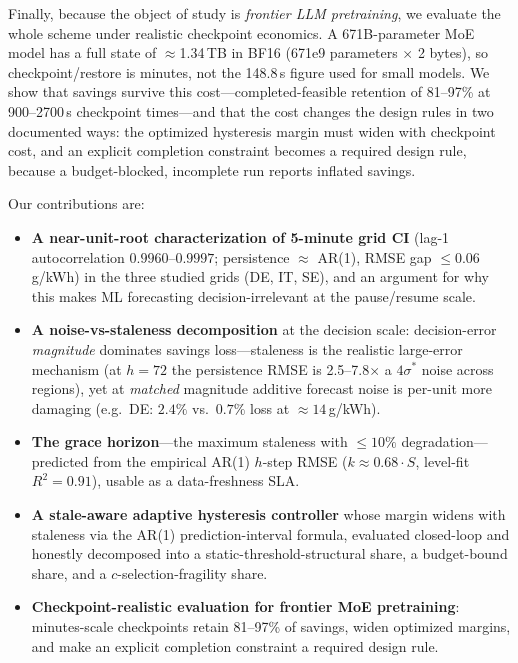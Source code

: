 \documentclass[sigconf,nonacm=false]{acmart}
\begin{document}
Finally, because the object of study is \emph{frontier LLM pretraining}, we
evaluate the whole scheme under realistic checkpoint economics. A 671B-parameter
MoE model has a full state of $\approx$1.34\,TB in BF16 (671e9 parameters
$\times$ 2 bytes), so checkpoint/restore is
minutes, not the 148.8\,s figure used for small models. We show that savings
survive this cost---completed-feasible retention of 81--97\% at 900--2700\,s
checkpoint times---and that the cost changes the design rules in two documented
ways: the optimized hysteresis margin must widen with checkpoint cost, and an
explicit completion constraint becomes a required design rule, because a
budget-blocked, incomplete run reports inflated savings.

Our contributions are:
\begin{itemize}
  \item \textbf{A near-unit-root characterization of 5-minute grid CI} (lag-1
        autocorrelation $0.9960$--$0.9997$; persistence $\approx$ AR(1), RMSE gap
        $\le 0.06$\,g/kWh) in the three studied grids (DE, IT, SE), and an argument
        for why this makes ML forecasting decision-irrelevant at the
        pause/resume scale.
  \item \textbf{A noise-vs-staleness decomposition} at the decision scale:
        decision-error \emph{magnitude} dominates savings loss---staleness is the
        realistic large-error mechanism (at $h{=}72$ the persistence RMSE is
        2.5--7.8$\times$ a $4\sigma^*$ noise across regions), yet at
        \emph{matched} magnitude additive forecast noise is per-unit more
        damaging (e.g.\ DE: $2.4\%$ vs.\ $0.7\%$ loss at $\approx14$\,g/kWh).
  \item \textbf{The grace horizon}---the maximum staleness with $\le 10\%$
        degradation---predicted from the empirical AR(1) $h$-step RMSE
        ($k\approx0.68\cdot S$, level-fit $R^2{=}0.91$), usable as a data-freshness SLA.
  \item \textbf{A stale-aware adaptive hysteresis controller} whose margin
        widens with staleness via the AR(1) prediction-interval formula,
        evaluated closed-loop and honestly decomposed into a
        static-threshold-structural share, a budget-bound share, and a
        $c$-selection-fragility share.
  \item \textbf{Checkpoint-realistic evaluation for frontier MoE pretraining}:
        minutes-scale checkpoints retain 81--97\% of savings, widen optimized
        margins, and make an explicit completion constraint a required design
        rule.
\end{itemize}
\end{document}
